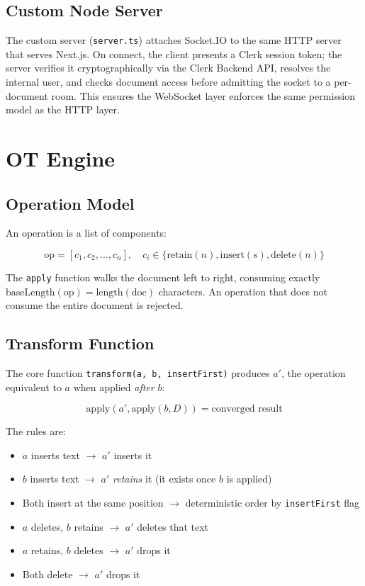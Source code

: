 \documentclass[conference]{IEEEtran}
\begin{document}
\subsection{Custom Node Server}

The custom server (\texttt{server.ts}) attaches Socket.IO to the same HTTP server that serves Next.js. On connect, the client presents a Clerk session token; the server verifies it cryptographically via the Clerk Backend API, resolves the internal user, and checks document access before admitting the socket to a per-document room. This ensures the WebSocket layer enforces the same permission model as the HTTP layer.

\section{OT Engine}\label{sec:ot}

\subsection{Operation Model}

An operation is a list of components:

\begin{equation}
\text{op} = [c_1, c_2, \ldots, c_n], \quad c_i \in \{\text{retain}(n), \text{insert}(s), \text{delete}(n)\}
\end{equation}

The \texttt{apply} function walks the document left to right, consuming exactly $\text{baseLength}(\text{op}) = \text{length}(\text{doc})$ characters. An operation that does not consume the entire document is rejected.

\subsection{Transform Function}

The core function \texttt{transform(a, b, insertFirst)} produces $a'$, the operation equivalent to $a$ when applied \emph{after} $b$:

\begin{equation}
\text{apply}(a', \text{apply}(b, D)) = \text{converged result}
\end{equation}

The rules are:
\begin{itemize}
\item $a$ inserts text $\rightarrow$ $a'$ inserts it
\item $b$ inserts text $\rightarrow$ $a'$ \emph{retains} it (it exists once $b$ is applied)
\item Both insert at the same position $\rightarrow$ deterministic order by \texttt{insertFirst} flag
\item $a$ deletes, $b$ retains $\rightarrow$ $a'$ deletes that text
\item $a$ retains, $b$ deletes $\rightarrow$ $a'$ drops it
\item Both delete $\rightarrow$ $a'$ drops it
\end{itemize}
\end{document}
